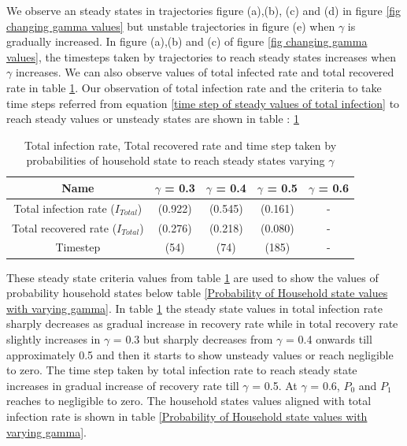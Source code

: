 \documentclass[paper=a4, fontsize=11pt, twoside, BCOR=12mm, parskip=full, listof=totoc]{scrreprt}
\begin{document}
{We observe an steady states in trajectories figure (a),(b), (c) and (d) in figure \ref{fig changing gamma values} but unstable trajectories in figure (e) when $\gamma$ is gradually increased. In figure (a),(b) and (c) of figure \ref{fig changing gamma values}, the timesteps taken by trajectories to reach steady states increases when $\gamma$ increases. We can also observe values of total infected rate and total recovered rate in table \ref{tab Total infection rate and days reached for Probabilities of Household to reach steady states varying gamma}.
Our observation of total infection rate and the criteria to take time steps referred from equation \ref{time step of steady values of total infection} to reach steady values or unsteady states are shown in table : \ref{tab Total infection rate and days reached for Probabilities of Household to reach steady states varying gamma} 
 
\begin{table}[H]
	\centering 
	\caption{Total infection rate, Total recovered rate and time step taken by probabilities of household state to reach steady states varying $\gamma$}
	\label{tab Total infection rate and days reached for Probabilities of Household to reach steady states varying gamma}
	\begin{tabular}{ccccc}
	\toprule
     Name & $\gamma$ = 0.3 & $\gamma$ = 0.4 & $\gamma$ = 0.5 & $\gamma$ = 0.6 \\
     \midrule
     Total infection rate ($I_{Total}$) & (0.922) & (0.545) & (0.161) & - \\
     Total recovered rate ($I_{Total}$) & (0.276) & (0.218) & (0.080) & - \\
	 Timestep & (54) & (74) & (185) & - \\
	\bottomrule
	\end{tabular}
\end{table}

These steady state criteria values from table \ref{tab Total infection rate and days reached for Probabilities of Household to reach steady states varying gamma} are used to show the values of probability household states below table \ref{Probability of Household state values with varying gamma}. In table \ref{tab Total infection rate and days reached for Probabilities of Household to reach steady states varying gamma} the steady state values in total infection rate sharply decreases as gradual increase in recovery rate while in total recovery rate slightly increases in $\gamma$ = 0.3 but sharply decreases from $\gamma$ = 0.4 onwards till approximately 0.5 and then it starts to show unsteady values or reach negligible to zero. The time step taken by total infection rate to reach steady state increases in gradual increase of recovery rate till $\gamma$ = 0.5. At $\gamma$ = 0.6, $P_0$ and $P_1$ reaches to negligible to zero. The household states values aligned with total infection rate is shown in table \ref{Probability of Household state values with varying gamma}.


}
\end{document}
